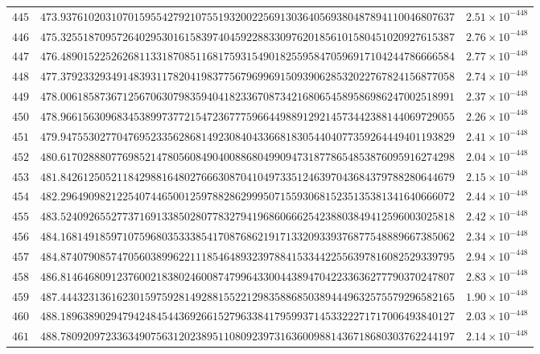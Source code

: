 \documentclass[12pt,reqno]{amsart}
\theoremstyle{remark}
\begin{document}
\begin{longtable}{clc}
$445$ & $473.9376102031070159554279210755193200225691303640569380487894110046807637$ & $2.51\times 10^{-448}$ \\
$446$ & $475.3255187095726402953016158397404592288330976201856101580451020927615387$ & $2.76\times 10^{-448}$ \\
$447$ & $476.4890152252626811331870851168175931549018255958470596917104244786666584$ & $2.77\times 10^{-448}$ \\
$448$ & $477.3792332934914839311782041983775679699691509390628532022767824156877058$ & $2.74\times 10^{-448}$ \\
$449$ & $478.0061858736712567063079835940418233670873421680654589586986247002518991$ & $2.37\times 10^{-448}$ \\
$450$ & $478.9661563096834538997377215472367775966449889129214573442388144069729055$ & $2.26\times 10^{-448}$ \\
$451$ & $479.9475530277047695233562868149230840433668183054404077359264449401193829$ & $2.41\times 10^{-448}$ \\
$452$ & $480.6170288807769852147805608490400886804990947318778654853876095916274298$ & $2.04\times 10^{-448}$ \\
$453$ & $481.8426125052118429881648027666308704104973351246397043684379788280644679$ & $2.15\times 10^{-448}$ \\
$454$ & $482.2964909821225407446500125978828629995071559306815235135381341640666072$ & $2.44\times 10^{-448}$ \\
$455$ & $483.5240926552773716913385028077832794196860666254238803849412596003025818$ & $2.42\times 10^{-448}$ \\
$456$ & $484.1681491859710759680353338541708768621917133209339376877548889667385062$ & $2.34\times 10^{-448}$ \\
$457$ & $484.8740790857470560389962211185464893239788415334422556397816082529339795$ & $2.94\times 10^{-448}$ \\
$458$ & $486.8146468091237600218380246008747996433004438947042233636277790370247807$ & $2.83\times 10^{-448}$ \\
$459$ & $487.4443231361623015975928149288155221298358868503894449632575579296582165$ & $1.90\times 10^{-448}$ \\
$460$ & $488.1896389029479424845443692661527963384179599371453322271717006493840127$ & $2.03\times 10^{-448}$ \\
$461$ & $488.7809209723363490756312023895110809239731636009881436718680303762244197$ & $2.14\times 10^{-448}$ \\

\end{longtable}
\end{document}
